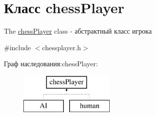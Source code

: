 \hypertarget{classchess_player}{}\section{Класс chess\+Player}
\label{classchess_player}


The \hyperlink{classchess_player}{chess\+Player} class -\/ абстрактный класс игрока  




{\ttfamily \#include $<$chessplayer.\+h$>$}

Граф наследования\+:chess\+Player\+:\begin{figure}[H]
\begin{center}
\leavevmode
\includegraphics[height=2.000000cm]{classchess_player}
\end{center}
\end{figure}
